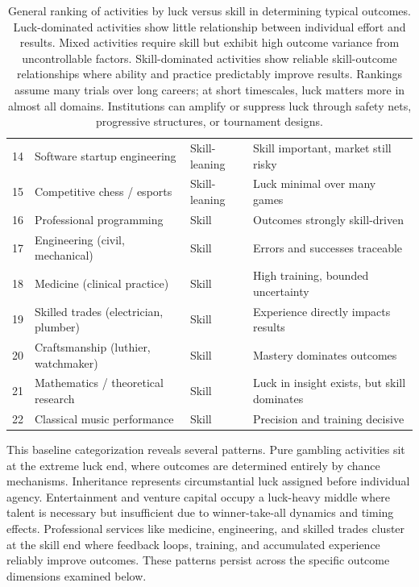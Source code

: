 \begin{table}[H]
\begin{tabular}{clll}
    14                     & Software startup engineering          & Skill-leaning            & Skill important, market still risky         \\
    15                     & Competitive chess / esports           & Skill-leaning            & Luck minimal over many games                \\
    16                     & Professional programming              & Skill                    & Outcomes strongly skill-driven              \\
    17                     & Engineering (civil, mechanical)       & Skill                    & Errors and successes traceable              \\
    18                     & Medicine (clinical practice)          & Skill                    & High training, bounded uncertainty          \\
    19                     & Skilled trades (electrician, plumber) & Skill                    & Experience directly impacts results         \\
    20                     & Craftsmanship (luthier, watchmaker)   & Skill                    & Mastery dominates outcomes                  \\
    21                     & Mathematics / theoretical research    & Skill                    & Luck in insight exists, but skill dominates \\
    22                     & Classical music performance           & Skill                    & Precision and training decisive             \\
    \bottomrule
  \end{tabular}
  \caption{General ranking of activities by luck versus skill in
  determining typical outcomes. Luck-dominated activities show little relationship
  between individual effort and results. Mixed activities require skill
  but exhibit high outcome variance from uncontrollable factors. Skill-dominated
  activities show reliable skill-outcome relationships where ability and
  practice predictably improve results. Rankings assume many trials over
  long careers; at short timescales, luck matters more in almost all
  domains. Institutions can amplify or suppress luck through safety nets,
  progressive structures, or tournament designs.}
  \label{tab:general_rankings}
\end{table}

This baseline categorization reveals several patterns. Pure gambling
activities sit at the extreme luck end, where outcomes are determined entirely
by chance mechanisms. Inheritance represents circumstantial luck
assigned before individual agency. Entertainment and venture capital occupy
a luck-heavy middle where talent is necessary but insufficient due to winner-take-all
dynamics and timing effects. Professional services like medicine, engineering,
and skilled trades cluster at the skill end where feedback loops, training,
and accumulated experience reliably improve outcomes. These patterns persist
across the specific outcome dimensions examined below.

